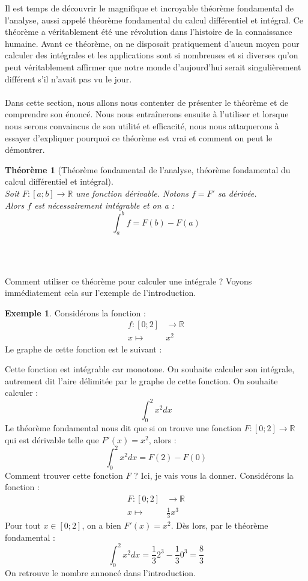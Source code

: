 \documentclass[a4paper,fontsize=13pt]{scrreprt}
\theoremstyle{plain}
\newtheorem{thé}[subsection]{Théorème}
\theoremstyle{definition}
\newtheorem{exe}[subsection]{Exemple}
\newcommand{\rr}{\mathbb{R}}
\newcommand {\axes} {
	\draw[thick, ->] (\xmin,0) -- (\xmax+1,0);
	\draw[thick, ->] (0,\ymin) -- (0,\ymax+1);
	\draw (0,\ymax+0.5) node [left] {$y$};
	\draw (\xmax+0.5, 0) node [below] {$x$};
	\draw[thick] (-0.15,1)--(0.15,1) (1,-0.15)--(1,0.15);
	\draw (0,1)node[left]{$1$} (1,0)node[below]{$1$};
}
\begin{document}
Il est temps de découvrir le magnifique et incroyable théorème fondamental de l'analyse, aussi appelé théorème fondamental du calcul différentiel et intégral. Ce théorème a véritablement été une révolution dans l'histoire de la connaissance humaine. Avant ce théorème, on ne disposait pratiquement d'aucun moyen pour calculer des intégrales et les applications sont si nombreuses et si diverses qu'on peut véritablement affirmer que notre monde d'aujourd'hui serait singulièrement différent s'il n'avait pas vu le jour. \\
~\\
Dans cette section, nous allons nous contenter de présenter le théorème et de comprendre son énoncé. Nous nous entraînerons ensuite à l'utiliser et lorsque nous serons convaincus de son utilité et efficacité, nous nous attaquerons à essayer d'expliquer pourquoi ce théorème est vrai et comment on peut le démontrer.\\
\begin{large}
\begin{thé} [Théorème fondamental de l'analyse, théorème fondamental du calcul différentiel et intégral] ~\\
Soit $F : [a;b] \to \rr$ une fonction dérivable. Notons $f = F'$ sa dérivée. \\
Alors $f$ est nécessairement intégrable et on a :
$$\int_{a}^{b} f = F(b) - F(a)$$
\end{thé} ~\\\end{large}~\\
Comment utiliser ce théorème pour calculer une intégrale ? Voyons immédiatement cela sur l'exemple de l'introduction.
\begin{exe}
Considérons la fonction :
\begin{align*}
f : [0;2]& \to \rr \\
x \mapsto & x^2
\end{align*}
Le graphe de cette fonction est le suivant :
\begin{center}
\end{center}
Cette fonction est intégrable car monotone. On souhaite calculer son intégrale, autrement dit l'aire délimitée par le graphe de cette fonction. On souhaite calculer :
$$\int_{0}^{2} x^2 dx$$
Le théorème fondamental nous dit que si on trouve une fonction $F : [0;2] \to \rr$ qui est dérivable telle que $F'(x) = x^2$, alors :
$$\int_{0}^{2} x^2 dx = F(2) - F(0)$$
Comment trouver cette fonction $F$ ? Ici, je vais vous la donner. Considérons la fonction :
\begin{align*}
F : [0;2]& \to \rr \\
x \mapsto & \frac{1}{3}x^3
\end{align*}
Pour tout $x \in [0;2]$, on a bien $F'(x) = x^2$. Dès lors, par le théorème fondamental :
$$\int_{0}^{2} x^2 dx =\frac{1}{3}2^3 - \frac{1}{3}0^3 = \frac{8}{3}$$
On retrouve le nombre annoncé dans l'introduction.
\end{exe}
\end{document}
